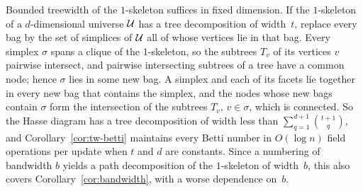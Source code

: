 Bounded treewidth of the $1$-skeleton suffices in fixed dimension.
If the $1$-skeleton of a $d$-dimensional universe $\mathcal{U}$ has a tree decomposition of width~$t$, replace every bag by the set of simplices of $\mathcal{U}$ all of whose vertices lie in that bag.
Every simplex $\sigma$ spans a clique of the $1$-skeleton, so the subtrees $T_v$ of its vertices $v$ pairwise intersect, and pairwise intersecting subtrees of a tree have a common node; hence $\sigma$ lies in some new bag.
A simplex and each of its facets lie together in every new bag that contains the simplex, and the nodes whose new bags contain $\sigma$ form the intersection of the subtrees $T_v$, $v\in\sigma$, which is connected.
So the Hasse diagram has a tree decomposition of width less than $\sum_{q=1}^{d+1}\binom{t+1}{q}$, and Corollary~\ref{cor:tw-betti} maintains every Betti number in $O(\log n)$ field operations per update when $t$ and $d$ are constants.
Since a numbering of bandwidth $b$ yields a path decomposition of the $1$-skeleton of width~$b$, this also covers Corollary~\ref{cor:bandwidth}, with a worse dependence on~$b$.
